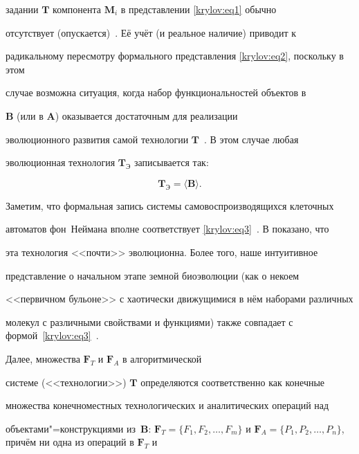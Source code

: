 задании $\mathbf{T}$ компонента $\mathbf{M}_i$ в представлении \eqref{krylov:eq1} обычно

отсутствует (опускается)~\cite{krylov:bib6}. Её учёт (и реальное наличие) приводит к

радикальному пересмотру формального представления \eqref{krylov:eq2}, поскольку в этом

случае возможна ситуация, когда набор функциональностей объектов в

$\mathbf{B}$ (или в $\mathbf{A}$) оказывается достаточным для реализации

эволюционного развития самой технологии $\mathbf{T}$~\cite{krylov:bib6}. В этом случае любая

эволюционная технология $\mathbf{T}_{\text{Э}}$ записывается так:

\begin{equation}

\label{krylov:eq3}

\mathbf{T}_{\text{Э}}=\langle \mathbf{B}\rangle.

\end{equation}



Заметим, что формальная запись системы самовоспроизводящихся клеточных

автоматов фон~Неймана вполне соответствует \eqref{krylov:eq3}~\cite{krylov:bib5,krylov:bib6}. В \cite{krylov:bib3} показано, что

эта технология <<почти>> эволюционна. Более того, наше интуитивное

представление о начальном этапе земной биоэволюции (как о некоем

<<первичном бульоне>> с хаотически движущимися в нём наборами различных

молекул с различными свойствами и функциями) также совпадает с формой~\eqref{krylov:eq3}~\cite{krylov:bib5}.



Далее, множества $\mathbf{F}_{T}$ и $\mathbf{F}_{A}$ в алгоритмической

системе (<<технологии>>) $\mathbf{T}$ определяются соответственно как конечные

множества конечноместных технологических и аналитических операций над

объектами"=конструкциями из~$\mathbf{B}$: $\mathbf{F}_{T}=\{ F_1,

F_{2} ,\ldots, F_{m}\}$ и $\mathbf{F}_{A}=\{P_{1}, P_{2},\ldots,

P_{n}\}$, причём ни одна из операций в $\mathbf{F}_{T}$ и

